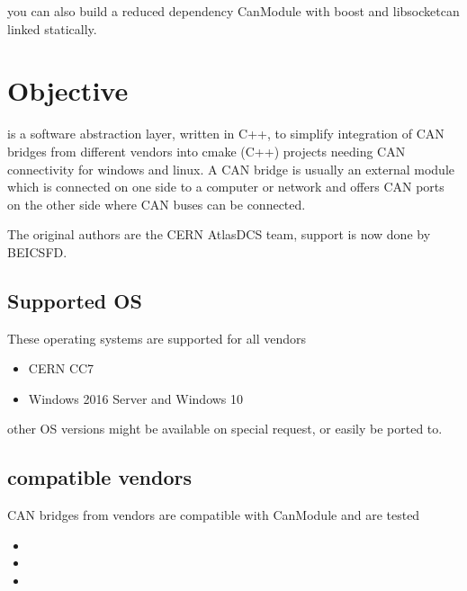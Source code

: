 \documentclass[a4paper,10pt,english]{sphinxmanual}
\begin{document}
you can also build a reduced dependency CanModule with boost and libsocketcan linked statically.


\chapter{Objective}
\label{\detokenize{objective:objective}}\label{\detokenize{objective::doc}}
 is a software abstraction layer, written in C++, to simplify integration
of CAN bridges from different vendors into cmake (C++) projects needing CAN connectivity
for windows and linux. A CAN bridge is \sphinxhyphen{} usually \sphinxhyphen{} an external module which is connected
on one side to a computer or network and offers CAN ports on the other side where CAN buses
can be connected.

The original authors are the CERN Atlas\sphinxhyphen{}DCS team, support is now done by BE\sphinxhyphen{}ICS\sphinxhyphen{}FD.


\section{Supported OS}
\label{\detokenize{objective:supported-os}}
These operating systems are supported for all vendors
\begin{itemize}
\item {} 
CERN CC7

\item {} 
Windows 2016 Server and Windows 10

\end{itemize}

other OS versions might be available on special request, or easily be ported to.


\section{compatible vendors}
\label{\detokenize{objective:compatible-vendors}}
CAN bridges from vendors are compatible with CanModule and are tested
\begin{itemize}
\item {} 

\item {} 

\item {} 

\end{itemize}
\end{document}

